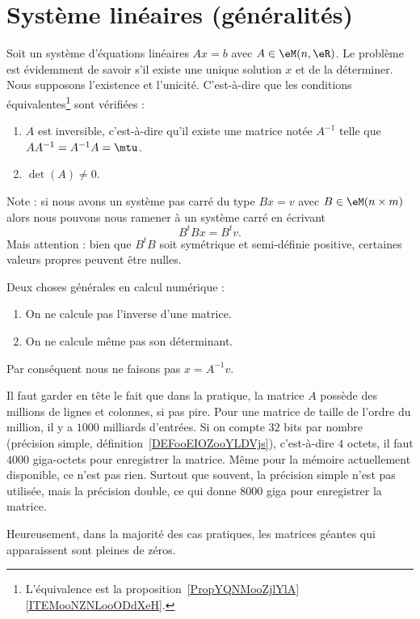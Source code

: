 \section{Système linéaires (généralités)}

Soit un système d'équations linéaires \( Ax=b\) avec \( A\in \eM(n,\eR)\). Le problème est évidemment de savoir s'il existe une unique solution \( x\) et de la déterminer. Nous supposons l'existence et l'unicité. C'est-à-dire que les conditions équivalentes\footnote{L'équivalence est la proposition~\ref{PropYQNMooZjlYlA}\ref{ITEMooNZNLooODdXeH}.} sont vérifiées :
\begin{enumerate}
    \item
        \( A\) est inversible, c'est-à-dire qu'il existe une matrice notée \( A^{-1}\) telle que \( AA^{-1}=A^{-1}A=\mtu\).
    \item
        \( \det(A)\neq 0\).
\end{enumerate}
Note : si  nous avons un système pas carré du type \( Bx=v\) avec \( B\in \eM(n\times m)\) alors nous pouvons nous ramener à un système carré en écrivant
\begin{equation}
    B^tBx=B^tv.
\end{equation}
Mais attention : bien que \( B^tB\) soit symétrique et semi-définie positive, certaines valeurs propres peuvent être nulles.

\begin{normaltext}
    Deux choses générales en calcul numérique :
    \begin{enumerate}
        \item
            On ne calcule pas l'inverse d'une matrice.
        \item
            On ne calcule même pas son déterminant.
    \end{enumerate}
    Par conséquent nous ne faisons pas \( x=A^{-1}v\).

    Il faut garder en tête le fait que dans la pratique, la matrice \( A\) possède des millions de lignes et colonnes, si pas pire. Pour une matrice de taille de l'ordre du million, il y a \( 1000\) milliards d'entrées. Si on compte \( 32\) bits par nombre (précision simple, définition~\ref{DEFooEIOZooYLDVjs}), c'est-à-dire \( 4\) octets, il faut \( 4000\) giga-octets pour enregistrer la matrice. Même pour la mémoire actuellement disponible, ce n'est pas rien. Surtout que souvent, la précision simple n'est pas utilisée, mais la précision double, ce qui donne \( 8000\) giga pour enregistrer la matrice.

    Heureusement, dans la majorité des cas pratiques, les matrices géantes qui apparaissent sont pleines de zéros.

\end{normaltext}

